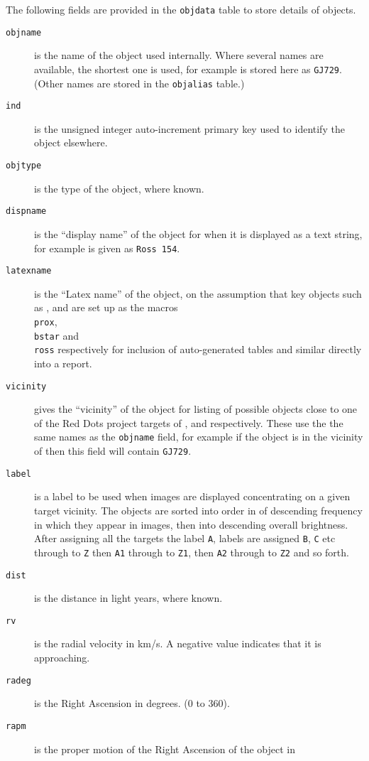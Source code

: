 The following fields are provided in the \texttt{objdata} table to store details
of objects.

\begin{description}
\item[\tt objname] is the name of the object used internally. Where several
names are available, the shortest one is used, for example {\ross} is stored
here as \texttt{GJ729}. (Other names are stored in the \texttt{objalias} table.)
\item[\tt ind] is the unsigned integer auto-increment primary key used to
identify the object elsewhere.
\item[\tt objtype] is the type of the object, where known.
\item[\tt dispname] is the ``display name'' of the object for when it is
displayed as a text string, for example {\ross} is given as \texttt{Ross 154}.
\item[\tt latexname] is the ``Latex name'' of the object, on the assumption that
key objects such as \prox, {\bstar} and {\ross} are set up as the macros
\texttt{\\prox}, \texttt{\\bstar} and \texttt{\\ross} respectively for inclusion
of auto-generated tables and similar directly into a report.
\item[\tt vicinity] gives the ``vicinity'' of the object for listing of possible
objects close to one of the Red Dots project targets of \prox, {\bstar} and
{\ross} respectively. These use the the same names as the \texttt{objname}
field, for example if the object is in the vicinity of {\ross} then this field
will contain \texttt{GJ729}.
\item[\tt label] is a label to be used when images are displayed concentrating
on a given target vicinity.
The objects are sorted into order in of descending frequency in which they appear in images,
then into descending overall brightness. After assigning all the targets the
label \texttt{A}, labels are assigned \texttt{B}, \texttt{C} etc through to
\texttt{Z} then \texttt{A1} through to \texttt{Z1}, then \texttt{A2} through to
\texttt{Z2} and so forth.
\item[\tt dist] is the distance in light years, where known.
\item[\tt rv] is the radial velocity in km/s. A negative value indicates that it
is approaching.
\item[\tt radeg] is the Right Ascension in degrees. (0 to 360).
\item[\tt rapm] is the proper motion of the Right Ascension of the object in

\end{description}
